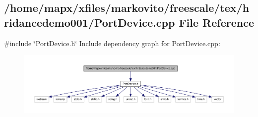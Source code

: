 \subsection{/home/mapx/xfiles/markovito/freescale/tex/hridancedemo001/\-Port\-Device.cpp \-File \-Reference}
\label{_port_device_8cpp}
{\ttfamily \#include \char`\"{}\-Port\-Device.\-h\char`\"{}}\*
\-Include dependency graph for \-Port\-Device.\-cpp\-:\nopagebreak
\begin{figure}[H]
\begin{center}
\leavevmode
\includegraphics[width=350pt]{_port_device_8cpp__incl}
\end{center}
\end{figure}
